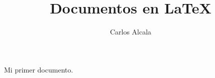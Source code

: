 \documentclass{article}
\author{Carlos Alcala}
\title{Documentos en \LaTeX}
\date{}
\begin{document}
	\maketitle
	Mi primer documento.
\end{document}
